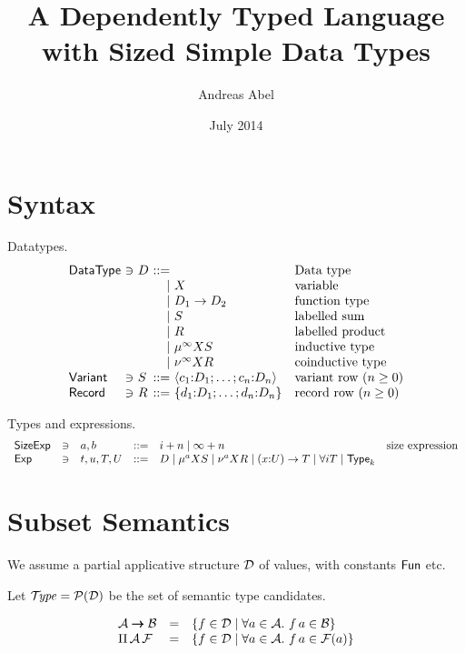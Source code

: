 \documentclass{article}
\title{A Dependently Typed Language with Sized Simple Data Types}
\author{Andreas Abel}
\date{July 2014}
\begin{document}
\maketitle

\section{Syntax}

Datatypes.
\[
\begin{array}{l@{~}l@{~}l@{~}r@{~}ll}
\DataType & \ni & D & ::= &      & \mbox{Data type}
  \\ &&& \mid & X                & \mbox{variable}
  \\ &&& \mid & D_1 \to D_2      & \mbox{function type}
  \\ &&& \mid & S                & \mbox{labelled sum}
  \\ &&& \mid & R                & \mbox{labelled product}
  \\ &&& \mid & \smu \infty X S  & \mbox{inductive type}
  \\ &&& \mid & \snu \infty X R  & \mbox{coinductive type}
\\
  \Variant & \ni & S      & ::= & \langle c_1 \of D_1 ; \dots ;
    c_n \of D_n \rangle
    & \mbox{variant row} \ (n \geq 0)
\\
  \Record  & \ni & R      & ::= & \{ d_1 \of D_1 ;\dots ;
    d_n \of D_n \}
    & \mbox{record row} \ (n \geq 0)
\end{array}
\]

Types and expressions.
\[
\begin{array}{lllrll}
\mathsf{SizeExp}  & \ni & a,b & ::= & i + n \mid \infty + n
  & \mbox{size expression} \\
\mathsf{Exp} & \ni & t,u,T,U & ::= & D
  \mid \mu^{a} X S
  \mid \nu^{a} X R
  \mid (x {:} U) \to T
  \mid \forall i T
  \mid \mathsf{Type}_k
\end{array}
\]

\section{Subset Semantics}

We assume a partial applicative structure $\mathcal{D}$ of values, with
constants $\mathsf{Fun}$ etc.

Let $\mathcal{T}\!\mathit{ype} = \mathcal{P}(\mathcal{D})$ be the set of semantic type candidates.

\[
\begin{array}{lll}
  \mathcal{A} \pmb{\to} \mathcal{B} & = & \{ f \in \mathcal{D} \mid \forall a \in \mathcal{A}.\ f\,a \in \mathcal{B} \}
\\
  \Pi\,\mathcal{A}\,\mathcal{F} & = & \{ f \in \mathcal{D} \mid \forall a \in \mathcal{A}.\ f\,a \in \mathcal{F}(a) \}
\end{array}
\]
\end{document}
